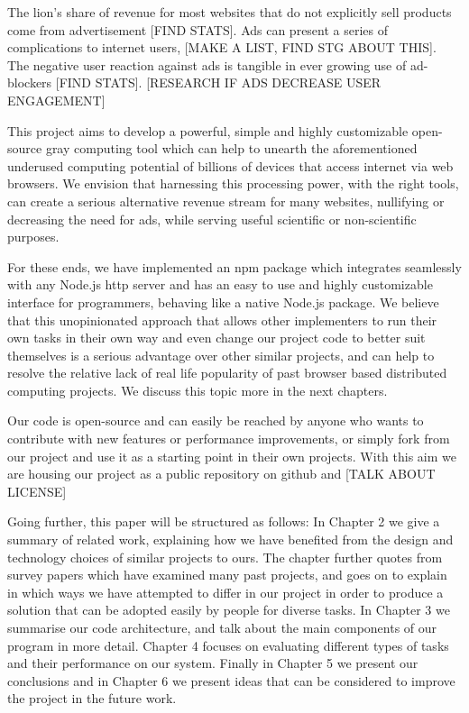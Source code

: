 The lion's share of revenue for most websites that do not explicitly sell products come from advertisement [FIND STATS]. Ads can present a series of complications to internet users, [MAKE A LIST, FIND STG ABOUT THIS]. The negative user reaction against ads is tangible in ever growing use of ad-blockers [FIND STATS]. [RESEARCH IF ADS DECREASE USER ENGAGEMENT]

This project aims to develop a powerful, simple and highly customizable open-source gray computing tool which can help to unearth the aforementioned underused computing potential of billions of devices that access internet via web browsers. We envision that harnessing this processing power, with the right tools, can create a serious alternative revenue stream for many websites, nullifying or decreasing the need for ads, while serving useful scientific or non-scientific purposes.

For these ends, we have implemented an npm package \cite{npm} which integrates seamlessly with any Node.js http server and has an easy to use and highly customizable interface for programmers, behaving like a native Node.js package. 
We believe that this unopinionated approach that allows other implementers to run their own tasks in their own way and even change our project code to better suit themselves is a serious advantage over other similar projects, and can help to resolve the relative lack of real life popularity of past browser based distributed computing projects. We discuss this topic more in the next chapters.

Our code is open-source and can easily be reached by anyone who wants to contribute with new features or performance improvements, or simply fork from our project and use it as a starting point in their own projects. With this aim we are housing our project as a public repository on github and [TALK ABOUT LICENSE]

Going further, this paper will be structured as follows: In Chapter 2 we give a summary of related work, explaining how we have benefited from the design and technology choices of similar projects to ours. The chapter further quotes from survey papers which have examined many past projects, and goes on to explain in which ways we have attempted to differ in our project in order to produce a solution that can be adopted easily by people for diverse tasks. In Chapter 3 we summarise our code architecture, and talk about the main components of our program in more detail. Chapter 4 focuses on evaluating different types of tasks and their performance on our system. Finally in Chapter 5 we present our conclusions and in Chapter 6 we present ideas that can be considered to improve the project in the future work.

